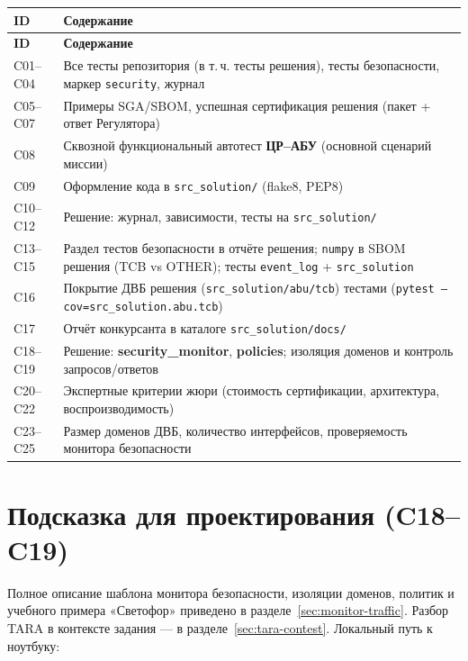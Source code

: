 \begin{longtable}{@{}p{}p{}@{}}
\toprule
\textbf{ID} & \textbf{Содержание} \\
\midrule
\endfirsthead
\toprule
\textbf{ID} & \textbf{Содержание} \\
\midrule
\endhead
C01--C04 & Все тесты репозитория (в т.\,ч. тесты решения), тесты безопасности, маркер \texttt{security}, журнал \\
C05--C07 & Примеры SGA/SBOM, успешная сертификация решения (пакет + ответ Регулятора) \\
C08 & Сквозной функциональный автотест \textbf{ЦР--АБУ} (основной сценарий миссии) \\
C09 & Оформление кода в \texttt{src\_solution/} (flake8, PEP8) \\
C10--C12 & Решение: журнал, зависимости, тесты на \texttt{src\_solution/} \\
C13--C15 & Раздел тестов безопасности в отчёте решения; \texttt{numpy} в SBOM решения (TCB vs OTHER); тесты \texttt{event\_log} + \texttt{src\_solution} \\
C16 & Покрытие ДВБ решения (\texttt{src\_solution/abu/tcb}) тестами (\texttt{pytest --cov=src\_solution.abu.tcb}) \\
C17 & Отчёт конкурсанта в каталоге \texttt{src\_solution/docs/} \\
C18--C19 & Решение: \textbf{security\_monitor}, \textbf{policies}; изоляция доменов и контроль запросов/ответов \\
C20--C22 & Экспертные критерии жюри (стоимость сертификации, архитектура, воспроизводимость) \\
C23--C25 & Размер доменов ДВБ, количество интерфейсов, проверяемость монитора безопасности \\
\bottomrule
\end{longtable}

\section{Подсказка для проектирования (C18--C19)}

Полное описание шаблона монитора безопасности, изоляции доменов, политик и учебного примера «Светофор» приведено в разделе~\ref{sec:monitor-traffic}. Разбор TARA в контексте задания --- в разделе~\ref{sec:tara-contest}. Локальный путь к ноутбуку:\\


